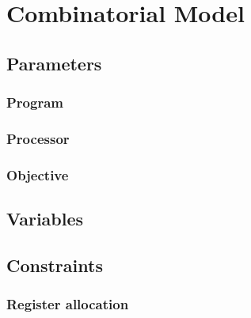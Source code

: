 \documentclass[11pt]{report}
\begin{document}
\chapter{Combinatorial Model}\label{sec:combinatorial-model}

\section{Parameters}\label{sec:parameters}


\subsection{Program}



\subsection{Processor}



\subsection{Objective}



\section{Variables}



\section{Constraints}



\subsection{Register allocation}
\end{document}
